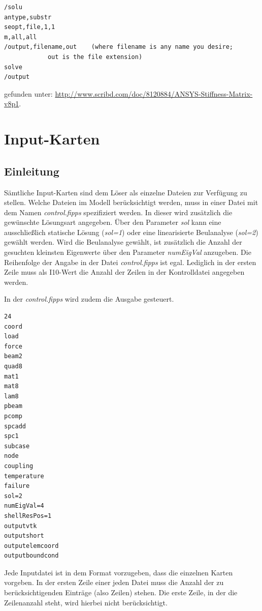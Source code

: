 \documentclass[11pt,titlepage,listof=totoc,bibliography=totoc,twoside]{scrreprt}
\begin{document}
{{%
\lstset{language=TeX}
\begin{lstlisting}[columns=fullflexible,basicstyle=\ttfamily,caption=Eingabe zur Ausgabe des Lastvektors in ANSYS,captionpos=b]
/solu
antype,substr
seopt,file,1,1
m,all,all
/output,filename,out	(where filename is any name you desire;
			out is the file extension)
solve
/output
\end{lstlisting}

gefunden unter: \url{http://www.scribd.com/doc/8120884/ANSYS-Stiffness-Matrix-v8p1}.

\newpage

\chapter{Input-Karten}

\section{Einleitung}

Sämtliche Input-Karten sind dem Löser als einzelne Dateien zur Verfügung zu stellen. Welche Dateien im Modell berücksichtigt werden, muss in einer Datei mit dem Namen \emph{control.fipps} spezifiziert werden. In dieser wird zusätzlich die gewünschte Lösungsart angegeben. Über den Parameter \emph{sol} kann eine ausschließlich statische Lösung (\emph{sol=1}) oder eine linearisierte Beulanalyse (\emph{sol=2}) gewählt werden. Wird die Beulanalyse gewählt, ist zusätzlich die Anzahl der gesuchten kleinsten Eigenwerte über den Parameter \emph{numEigVal} anzugeben. Die Reihenfolge der Angabe in der Datei \emph{control.fipps} ist egal. Lediglich in der ersten Zeile muss als I10-Wert die Anzahl der Zeilen in der Kontrolldatei angegeben werden.

In der \emph{control.fipps} wird zudem die Ausgabe gesteuert.

\lstset{language=Fortran}
\begin{lstlisting}[caption=Beispiel einer \emph{control.fipps}-Datei,captionpos=b]
       24
coord
load
force
beam2
quad8
mat1
mat8
lam8
pbeam
pcomp
spcadd
spc1
subcase
node
coupling
temperature
failure
sol=2
numEigVal=4
shellResPos=1
outputvtk
outputshort
outputelemcoord
outputboundcond
\end{lstlisting}

Jede Inputdatei ist in dem Format vorzugeben, dass die einzelnen Karten vorgeben. In der ersten Zeile einer jeden Datei muss die Anzahl der zu berücksichtigenden Einträge (also Zeilen) stehen. Die erste Zeile, in der die Zeilenanzahl steht, wird hierbei nicht berücksichtigt.

}}
\end{document}
